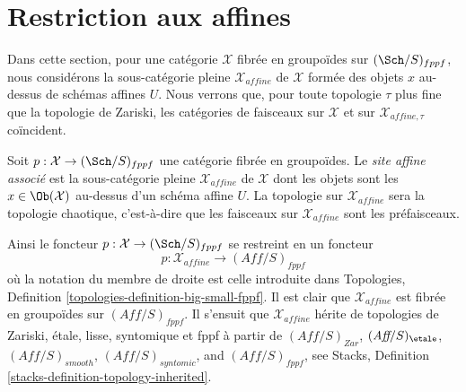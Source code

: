 \section{Restriction aux affines}
\label{section-alternative}

\noindent
Dans cette section, pour une catégorie $\mathcal{X}$ fibrée en groupoïdes sur
$(\Sch/S)_{fppf}$, nous considérons la sous-catégorie pleine $\mathcal{X}_{affine}$
de $\mathcal{X}$ formée des objets $x$ au-dessus de schémas affines $U$.
Nous verrons que, pour toute topologie $\tau$ plus fine que la topologie de Zariski,
les catégories de faisceaux sur $\mathcal{X}$ et sur $\mathcal{X}_{affine, \tau}$
coïncident.

\begin{definition}
\label{definition-alternative}
Soit $p : \mathcal{X} \to (\Sch/S)_{fppf}$ une catégorie fibrée en groupoïdes.
Le {\it site affine associé} est la sous-catégorie pleine
$\mathcal{X}_{affine}$ de $\mathcal{X}$ dont les objets sont les
$x \in \Ob(\mathcal{X})$ au-dessus d'un schéma affine $U$.
La topologie sur $\mathcal{X}_{affine}$ sera la topologie chaotique,
c'est-à-dire que les faisceaux sur $\mathcal{X}_{affine}$ sont les préfaisceaux.
\end{definition}

\noindent
Ainsi le foncteur $p : \mathcal{X} \to (\Sch/S)_{fppf}$ se restreint en un foncteur
$$
p : \mathcal{X}_{affine} \longrightarrow (\textit{Aff}/S)_{fppf}
$$
où la notation du membre de droite est celle introduite dans
Topologies, Definition \ref{topologies-definition-big-small-fppf}.
Il est clair que $\mathcal{X}_{affine}$ est fibrée en groupoïdes sur
$(\textit{Aff}/S)_{fppf}$. Il s'ensuit que $\mathcal{X}_{affine}$
hérite de topologies de Zariski, étale, lisse, syntomique et fppf
à partir de $(\textit{Aff}/S)_{Zar}$, $(\textit{Aff}/S)_\etale$,
$(\textit{Aff}/S)_{smooth}$, $(\textit{Aff}/S)_{syntomic}$, and
$(\textit{Aff}/S)_{fppf}$, see
Stacks, Definition \ref{stacks-definition-topology-inherited}.

